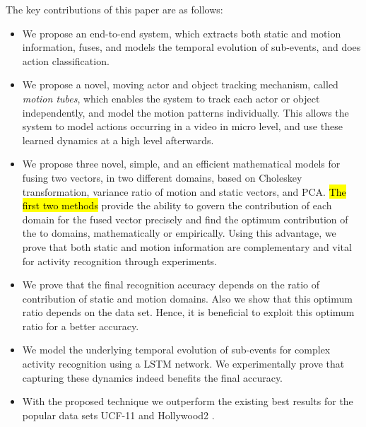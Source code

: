 The key contributions of this paper are as follows:

 \begin{itemize}
  \item We propose an end-to-end system, which  extracts both static and motion information, fuses, and models the
temporal evolution of sub-events, and does action classification.
  \item We propose a novel, moving actor and object tracking mechanism, called \textit{motion tubes},
which enables the system to track each actor or object independently, and model the motion patterns individually.
This allows the system to model actions occurring in a video in micro level, and use these learned dynamics
at a high level afterwards.
 \item We propose three novel, simple, and an efficient mathematical models for fusing two vectors,
in two different domains, based on Choleskey transformation, variance ratio of motion and static vectors, and PCA. \hl{The first two methods} provide
the ability to govern the contribution of each domain for the fused vector precisely and find the optimum contribution of the to domains, mathematically or empirically. Using this advantage, we prove that both static and motion information are complementary and vital for activity recognition through experiments.
 \item We prove that the final recognition accuracy depends on the ratio of contribution of static and motion domains. Also we show that
 this optimum ratio depends on the data set. Hence, it is beneficial to exploit this optimum ratio for a better accuracy.
  \item We model the underlying temporal evolution of sub-events for complex activity recognition using a LSTM network. We experimentally
prove that capturing these dynamics indeed benefits the final accuracy.

\item With the proposed technique
we outperform the existing best results for the popular data sets UCF-11 \cite{liu2009recognizing}
and Hollywood2 \cite{marszalek2009actions}.
 \end{itemize}




